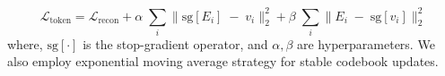 $$
\mathcal{L}_{\mathrm{token}}=\mathcal{L}_{\mathrm{recon}} + \alpha \;\sum_{i}
\bigl\|\mathrm{sg}[E_i]\;-\;v_i\bigr\|_2^2 + \beta \;\sum_{i}
\bigl\|E_i\;-\;\mathrm{sg}[v_i]\bigr\|_2^2
$$
where, $\mathrm{sg}[\cdot]$ is the stop-gradient operator, and $\alpha,\beta$ are hyperparameters. We also employ exponential moving average strategy\cite{van2017neural} for stable codebook updates. 








